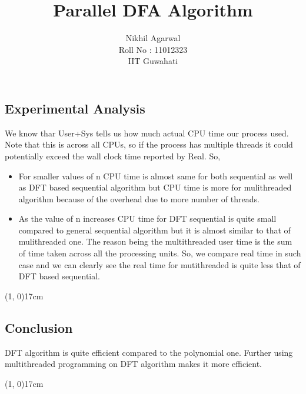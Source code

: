 \documentclass[10pt]{article}
\begin{document}
\begin{center}
 \section*{Experimental Analysis}
 \end{center}
 
 We know thar User+Sys tells us how much actual CPU time our process used. Note that this is across all CPUs, so if the process has multiple threads it could potentially exceed the wall clock time reported by Real. So,\\
 
\begin{itemize}

\item For smaller values of n CPU time is almost same for both sequential as well as DFT based sequential algorithm but CPU time is more for
   mulithreaded algorithm because of the overhead due to more number of threads.

\item As the value of n increases CPU time for DFT sequential is quite small compared to general sequential algorithm but it is almost similar
   to that of mulithreaded one. The reason being the multithreaded user time is the sum of time taken across all the processing units. So,
   we compare real time in such case and we can clearly see the real time for mutithreaded is quite less that of DFT based sequential.

 \end{itemize}
 
 \begin{center}
	\line(1, 0){17cm}
\end{center}


\begin{center}
 \section*{Conclusion}
\end{center}

DFT algorithm is quite efficient compared to the polynomial one. Further using multithreaded programming on DFT algorithm makes it more efficient.

 \begin{center}
	\line(1, 0){17cm}
\end{center}

\pagebreak

\begin{center}
\title{\textbf{\LARGE {Parallel DFA Algorithm\\}}}
\author{Nikhil Agarwal \\
		Roll No : 11012323 \\
		IIT Guwahati}
\end{center}
\end{document}
